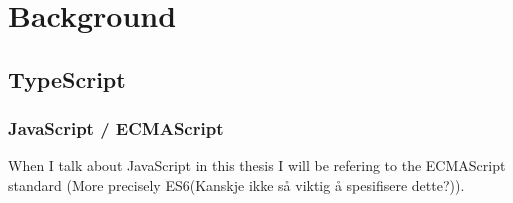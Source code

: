 
\chapter{Background}\label{ch:background}



\section{TypeScript}\label{sec:typescript}

\subsection{JavaScript  / ECMAScript}\label{subsec:javascript}

When I talk about JavaScript in this thesis I will be refering to the ECMAScript standard (More precisely ES6(Kanskje ikke så viktig å spesifisere dette?)).